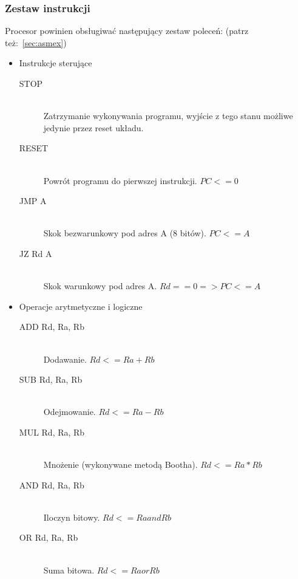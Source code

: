 \documentclass[a4paper,12pt]{report}
\begin{document}
\subsubsection{Zestaw instrukcji}
Procesor powinien obsługiwać następujący zestaw poleceń: (patrz też:~\ref{sec:asmex})
\begin{itemize}
\item Instrukcje sterujące
\begin{description}
\item[STOP] \hfill \\
Zatrzymanie wykonywania programu, wyjście z tego stanu możliwe jedynie przez reset układu.
\item[RESET] \hfill \\
Powrót programu do pierwszej instrukcji. $PC <= 0$
\item[JMP A] \hfill \\
Skok bezwarunkowy pod adres A (8 bitów). $PC <= A$
\item[JZ Rd A] \hfill \\
Skok warunkowy pod adres A. $Rd == 0 => PC <= A$
\end{description}

\item Operacje arytmetyczne i logiczne
\begin{description}
\item[ADD Rd, Ra, Rb] \hfill \\
Dodawanie. $Rd <= Ra + Rb$
\item[SUB Rd, Ra, Rb] \hfill \\
Odejmowanie. $Rd <= Ra - Rb$
\item[MUL Rd, Ra, Rb] \hfill \\
Mnożenie (wykonywane metodą Bootha). $Rd <= Ra * Rb$
\item[AND Rd, Ra, Rb] \hfill \\
Iloczyn bitowy. $Rd <= Ra and Rb$
\item[OR Rd, Ra, Rb] \hfill \\
Suma bitowa. $Rd <= Ra or Rb$
\end{description}


\end{itemize}
\end{document}
